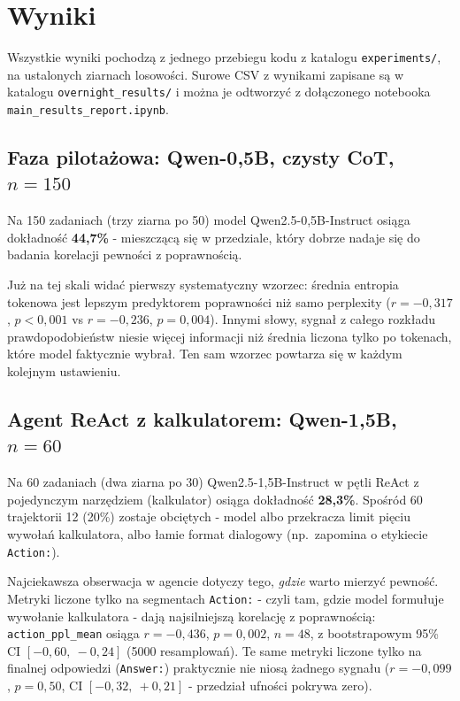 
\section{Wyniki}
\label{sec:wyniki}

Wszystkie wyniki pochodzą z jednego przebiegu kodu z katalogu
\texttt{experiments/}, na ustalonych ziarnach losowości. Surowe
CSV z wynikami zapisane są w katalogu \texttt{overnight\_results/}
i można je odtworzyć z dołączonego notebooka
\texttt{main\_results\_report.ipynb}.

\subsection{Faza pilotażowa: Qwen-0,5B, czysty CoT, $n=150$}
\label{sec:wyniki-pilot}

Na 150 zadaniach (trzy ziarna po 50) model Qwen2.5-0,5B-Instruct
osiąga dokładność \textbf{44,7\%} - mieszczącą się w przedziale,
który dobrze nadaje się do badania korelacji pewności z poprawnością.

Już na tej skali widać pierwszy systematyczny wzorzec: średnia
entropia tokenowa jest lepszym predyktorem poprawności niż samo
perplexity ($r = -0{,}317$, $p < 0{,}001$ vs $r = -0{,}236$,
$p = 0{,}004$). Innymi słowy, sygnał z całego rozkładu
prawdopodobieństw niesie więcej informacji niż średnia liczona
tylko po tokenach, które model faktycznie wybrał. Ten sam wzorzec
powtarza się w każdym kolejnym ustawieniu.

\subsection{Agent ReAct z kalkulatorem: Qwen-1,5B, $n=60$}
\label{sec:wyniki-agent}

Na 60 zadaniach (dwa ziarna po 30) Qwen2.5-1,5B-Instruct
w pętli ReAct z pojedynczym narzędziem (kalkulator) osiąga
dokładność \textbf{28,3\%}. Spośród 60 trajektorii 12 (20\%)
zostaje obciętych - model albo przekracza limit pięciu wywołań
kalkulatora, albo łamie format dialogowy (np.\ zapomina o etykiecie
\texttt{Action:}).

Najciekawsza obserwacja w agencie dotyczy tego, \emph{gdzie} warto
mierzyć pewność. Metryki liczone tylko na segmentach \texttt{Action:} -
czyli tam, gdzie model formułuje wywołanie kalkulatora - dają
najsilniejszą korelację z poprawnością: \texttt{action\_ppl\_mean}
osiąga $r = -0{,}436$, $p = 0{,}002$, $n = 48$, z bootstrapowym
95\% CI $[-0{,}60,\ -0{,}24]$ (5000 resamplowań). Te same metryki
liczone tylko na finalnej odpowiedzi (\texttt{Answer:}) praktycznie
nie niosą żadnego sygnału ($r = -0{,}099$, $p = 0{,}50$, CI
$[-0{,}32,\ +0{,}21]$ - przedział ufności pokrywa zero).

